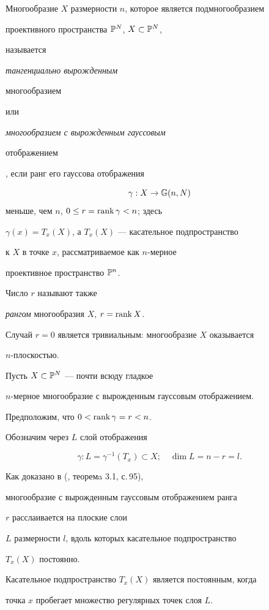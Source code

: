 Многообразие $X$ размерности $n$, которое является подмногообразием


проективного пространства $\Bbb{P}^N$, $X\subset \Bbb{P}^N$,


называется {\em тангенциально вырожденным


многообразием} или {\em многообразием с вырожденным гауссовым


отображением}, если ранг его гауссова отображения


$$


\gamma: X \rightarrow \Bbb{G} (n, N)


$$
меньше, чем $n$, $ 0 \leq r = \rank \gamma < n$; здесь


$\gamma (x) = T_x (X)$, а $T_x (X)$ --- касательное подпространство


к $X$ в точке $x$, рассматриваемое как $n$-мерное


проективное пространство $\Bbb{P}^n$.


Число $r$ называют также


{\em рангом} многообразия $X$, $r = \operatorname{rank} X$.


Случай $r= 0 $ является тривиальным: многообразие $X$ оказывается


$n$-плоскостью.



Пусть $X \subset \Bbb{P}^N$ --- почти всюду гладкое


$n$-мерное многообразие с вырожденным гауссовым отображением.


Предположим, что $0 < \operatorname{rank} \gamma = r < n$.


Обозначим через $L$ слой отображения


$$


\gamma:L = \gamma^{-1} (T_x) \subset X;\quad \dim L = n - r = l.


$$



Как доказано в (\cite{AG04}, теоремa 3.1, с.\,95),


многообразие с вырожденным гауссовым отображением ранга


$r$ расслаивается на плоские слои


$L$ размерности $l$, вдоль которых касательное подпространство


$T_x (X)$ постоянно.


 Касательное подпространство $T_x (X)$ является постоянным, когда


точка $x$ пробегает множество регулярных точек слоя $L$.



